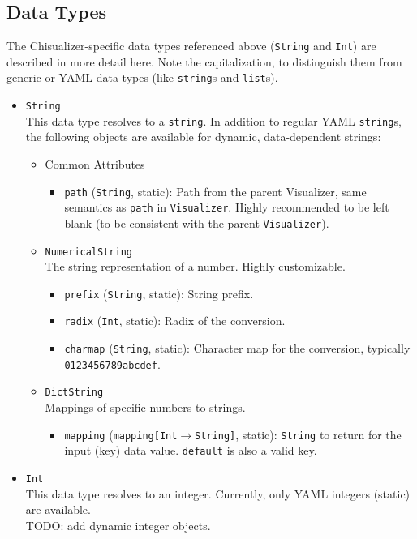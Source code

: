 \documentclass[11pt]{article}
\begin{document}
\subsection {Data Types}
The Chisualizer-specific data types referenced above (\texttt{String} and \texttt{Int}) are described in more detail here. Note the capitalization, to distinguish them from generic or YAML data types (like \texttt{string}s and \texttt{list}s).
\begin{itemize}
  \item \texttt{String} \\
  This data type resolves to a \texttt{string}. In addition to regular YAML \texttt{string}s, the following objects are available for dynamic, data-dependent strings:
  \begin{itemize}
    \item Common Attributes \\
    \begin{itemize}
      \item \texttt{path} (\texttt{String}, static): Path from the parent Visualizer, same semantics as \texttt{path} in \texttt{Visualizer}. Highly recommended to be left blank (to be consistent with the parent \texttt{Visualizer}).
    \end{itemize}    
    \item \texttt{NumericalString} \\
    The string representation of a number. Highly customizable.
    \begin{itemize}
      \item \texttt{prefix} (\texttt{String}, static): String prefix.
      \item \texttt{radix} (\texttt{Int}, static): Radix of the conversion.
      \item \texttt{charmap} (\texttt{String}, static): Character map for the conversion, typically \texttt{0123456789abcdef}.
    \end{itemize}
    \item \texttt{DictString} \\
    Mappings of specific numbers to strings.
    \begin{itemize}
      \item \texttt{mapping} (\texttt{mapping[Int$\rightarrow$String]}, static): \texttt{String} to return for the input (key) data value. \texttt{default} is also a valid key.
    \end{itemize}
  \end{itemize}
  \item \texttt{Int} \\
  This data type resolves to an integer. Currently, only YAML integers (static) are available. \\
  TODO: add dynamic integer objects.
\end{itemize}
\end{document}
